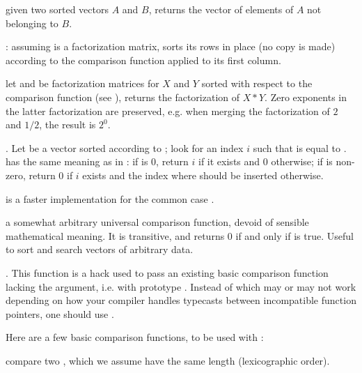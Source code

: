  given two sorted
vectors $A$ and $B$, returns the vector of elements of $A$ not belonging to
$B$.

:
assuming  is a factorization matrix, sorts its rows in place (no copy
is made) according to the comparison function  applied to its first
column.

let  and  be factorization matrices for $X$ and $Y$
sorted with respect to the comparison function  (see
), returns the factorization of $X * Y$. Zero exponents in
the latter factorization are preserved, e.g. when merging the factorization
of $2$ and $1/2$, the result is $2^0$.

.\hfil\break
Let  be a vector sorted according to ; look for an
index $i$ such that   is equal to .  has the
same meaning as in : if  is 0, return $i$ if it
exists and 0 otherwise; if  is non-zero, return $0$ if $i$ exists
and the index where  should be inserted otherwise.

 is a faster
implementation for the common case .


 a somewhat arbitrary universal
comparison function, devoid of sensible mathematical meaning. It is
transitive, and returns 0 if and only if  is true.
Useful to sort and search vectors of arbitrary data.

. This function is a hack
used to pass an existing basic comparison function lacking the 
argument, i.e. with prototype . Instead of
 which may or may not work depending on how your
compiler handles typecasts between incompatible function pointers, one should
use .

Here are a few basic comparison functions, to be used with :

 compare two , which we assume have
the same length (lexicographic order).

